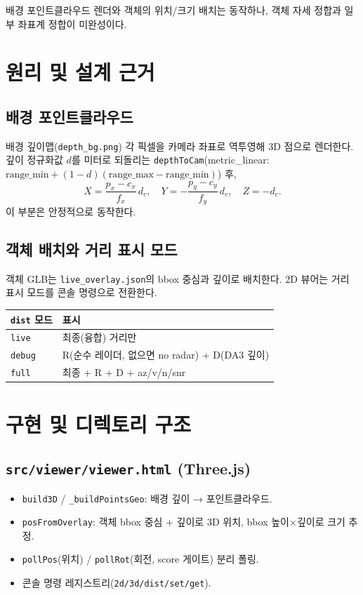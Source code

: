 \begin{statustodo}
배경 포인트클라우드 렌더와 객체의 위치/크기 배치는 동작하나, 객체 자세 정합과
일부 좌표계 정합이 미완성이다.
\end{statustodo}

\chapter{원리 및 설계 근거}

\section{배경 포인트클라우드}
배경 깊이맵(\texttt{depth\_bg.png}) 각 픽셀을 카메라 좌표로 역투영해 3D 점으로
렌더한다. 깊이 정규화값 $d$를 미터로 되돌리는 \texttt{depthToCam}(metric\_linear:
$\text{range\_min} + (1-d)(\text{range\_max}-\text{range\_min})$) 후,
\[
  X = \frac{p_x-c_x}{f_x}\,d_c,\quad
  Y = -\frac{p_y-c_y}{f_y}\,d_c,\quad Z = -d_c.
\]
이 부분은 안정적으로 동작한다.

\section{객체 배치와 거리 표시 모드}
객체 GLB는 \texttt{live\_overlay.json}의 bbox 중심과 깊이로 배치한다. 2D 뷰어는
거리 표시 모드를 콘솔 명령으로 전환한다.
\begin{center}
\begin{tabular}{@{}lp{8cm}@{}}
\toprule
\texttt{dist} 모드 & 표시 \\
\midrule
\texttt{live}  & 최종(융합) 거리만 \\
\texttt{debug} & R(순수 레이더, 없으면 no radar) + D(DA3 깊이) \\
\texttt{full}  & 최종 + R + D + az/v/n/snr \\
\bottomrule
\end{tabular}
\end{center}

\chapter{구현 및 디렉토리 구조}

\section{\texttt{src/viewer/viewer.html} (Three.js)}
\begin{itemize}
  \item \texttt{build3D} / \texttt{\_buildPointsGeo}: 배경 깊이 → 포인트클라우드.
  \item \texttt{posFromOverlay}: 객체 bbox 중심 + 깊이로 3D 위치, bbox 높이$\times$깊이로
        크기 추정.
  \item \texttt{pollPos}(위치) / \texttt{pollRot}(회전, score 게이트) 분리 폴링.
  \item 콘솔 명령 레지스트리(\texttt{2d/3d/dist/set/get}).
\end{itemize}


